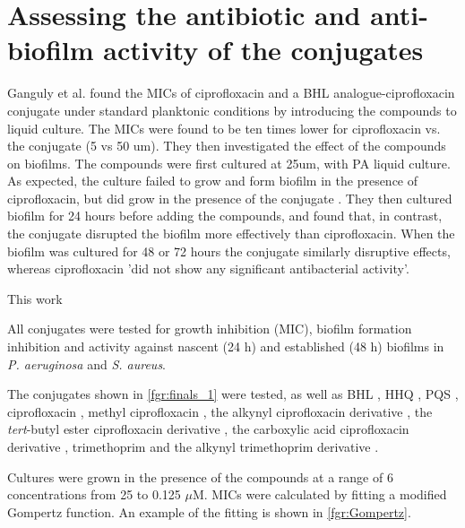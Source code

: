 \newpage

\section{Assessing the antibiotic and anti-biofilm activity of the conjugates}

Ganguly et al. \cite{Ganguly2011} found the MICs of ciprofloxacin and a BHL analogue-ciprofloxacin conjugate  under standard planktonic conditions by introducing the compounds to liquid culture. The MICs were found to be ten times lower for ciprofloxacin vs. the conjugate  (5 vs 50 um). They then investigated the effect of the compounds on biofilms. The compounds were first cultured at 25um, with PA liquid culture. As expected, the culture failed to grow and form biofilm in the presence of ciprofloxacin, but did grow in the presence of the conjugate . They then cultured biofilm for 24 hours before adding the compounds, and found that, in contrast, the conjugate  disrupted the biofilm more effectively than ciprofloxacin. When the biofilm was cultured for 48 or 72 hours the conjugate similarly disruptive effects, whereas ciprofloxacin 'did not show any significant antibacterial activity'.

This work 

All conjugates were tested for growth inhibition (MIC), biofilm formation inhibition and activity against nascent (24 h) and established (48 h) biofilms in \textit{P. aeruginosa} and \textit{S. aureus}.

The conjugates shown in \ref{fgr:finals_1} were tested, as well as BHL , HHQ , PQS , ciprofloxacin , methyl ciprofloxacin , the alkynyl ciprofloxacin derivative , the \textit{tert}-butyl ester ciprofloxacin derivative , the carboxylic acid ciprofloxacin derivative , trimethoprim  and the alkynyl trimethoprim derivative .

Cultures were grown in the presence of the compounds at a range of 6 concentrations from 25 to 0.125 $\mu$M. MICs were calculated by fitting a modified Gompertz function\cite{Lambert2016}. An example of the fitting is shown in \ref{fgr:Gompertz}. 

